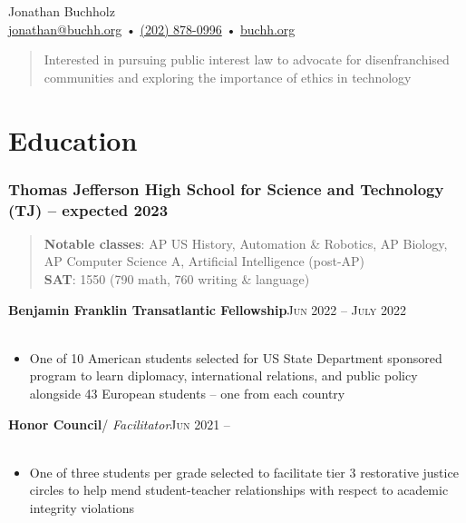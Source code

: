 \documentclass[12pt, a4paper]{article}
\begin{document}
{\LARGE Jonathan Buchholz}\\
\href{mailto:jonathan@buchh.org}{jonathan@buchh.org} • \href{tel:2028780996}{(202) 878-0996} • \href{https://buchh.org}{buchh.org}\\

\vspace{-6mm}
\begin{quote}
Interested in pursuing public interest law to advocate for disenfranchised communities and exploring the importance of ethics in technology\\
\end{quote}

\vspace{-14mm}
\section*{Education}
\vspace{-4mm}

\subsubsection*{Thomas Jefferson High School for Science and Technology (TJ) -- expected 2023}

\begin{quote}

\vspace{-1mm}
\textbf{Notable classes}: AP US History, Automation \& Robotics, AP Biology, AP Computer Science A, Artificial Intelligence (post-AP)\\

\vspace{-6mm}
\textbf{SAT}: 1550 (790 math, 760 writing \& language)\\

\end{quote}

\vspace{-6mm}
\textbf{Benjamin Franklin Transatlantic Fellowship}\hfill\textsc{Jun 2022 -- July 2022}\\\
\begin{itemize}
    \vspace{-8mm}
    \item One of 10 American students selected for US State Department sponsored program to learn diplomacy, international relations, and public policy alongside 43 European students – one from each country
\end{itemize}

\textbf{Honor Council}\hfill / \textit{Facilitator}\textsc{Jun 2021 --}\\\
\begin{itemize}
    \vspace{-8mm}
    \item One of three students per grade selected to facilitate tier 3 restorative justice circles to help mend student-teacher relationships with respect to academic integrity violations
\end{itemize}
\end{document}
